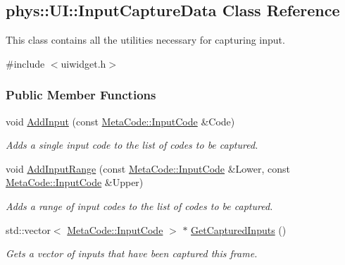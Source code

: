 \hypertarget{classphys_1_1UI_1_1InputCaptureData}{
\subsection{phys::UI::InputCaptureData Class Reference}
\label{classphys_1_1UI_1_1InputCaptureData}
}


This class contains all the utilities necessary for capturing input.  




{\ttfamily \#include $<$uiwidget.h$>$}

\subsubsection*{Public Member Functions}
\begin{DoxyCompactItemize}
\item 
void \hyperlink{classphys_1_1UI_1_1InputCaptureData_a46e7c734c74bbf8983ef0e87449dd931}{AddInput} (const \hyperlink{classphys_1_1MetaCode_a3e501cbb5bf0f6f1fdb7211465bda8d8}{MetaCode::InputCode} \&Code)
\begin{DoxyCompactList}\small\item\em Adds a single input code to the list of codes to be captured. \item\end{DoxyCompactList}\item 
void \hyperlink{classphys_1_1UI_1_1InputCaptureData_af63178e71795b7a1a011c85e76c0e81d}{AddInputRange} (const \hyperlink{classphys_1_1MetaCode_a3e501cbb5bf0f6f1fdb7211465bda8d8}{MetaCode::InputCode} \&Lower, const \hyperlink{classphys_1_1MetaCode_a3e501cbb5bf0f6f1fdb7211465bda8d8}{MetaCode::InputCode} \&Upper)
\begin{DoxyCompactList}\small\item\em Adds a range of input codes to the list of codes to be captured. \item\end{DoxyCompactList}\item 
std::vector$<$ \hyperlink{classphys_1_1MetaCode_a3e501cbb5bf0f6f1fdb7211465bda8d8}{MetaCode::InputCode} $>$ $\ast$ \hyperlink{classphys_1_1UI_1_1InputCaptureData_abe46fa1848ded1b019287da766cfda25}{GetCapturedInputs} ()
\begin{DoxyCompactList}\small\item\em Gets a vector of inputs that have been captured this frame. \item\end{DoxyCompactList}\item 

\end{DoxyCompactItemize}
